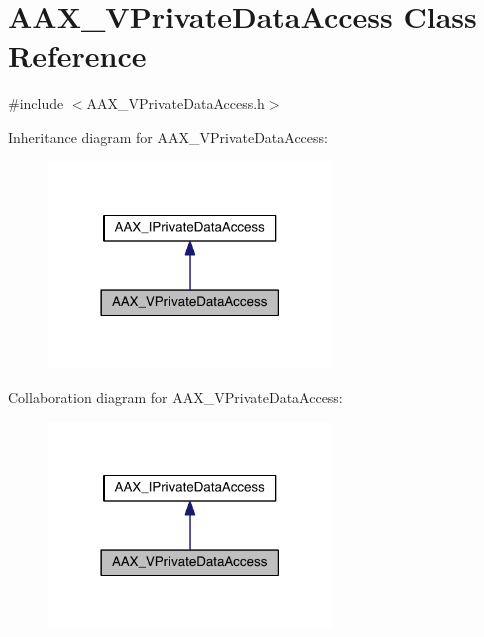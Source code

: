 \hypertarget{a00139}{}\section{A\+A\+X\+\_\+\+V\+Private\+Data\+Access Class Reference}
\label{a00139}


{\ttfamily \#include $<$A\+A\+X\+\_\+\+V\+Private\+Data\+Access.\+h$>$}



Inheritance diagram for A\+A\+X\+\_\+\+V\+Private\+Data\+Access\+:
\nopagebreak
\begin{figure}[H]
\begin{center}
\leavevmode
\includegraphics[width=213pt]{a00713}
\end{center}
\end{figure}


Collaboration diagram for A\+A\+X\+\_\+\+V\+Private\+Data\+Access\+:
\nopagebreak
\begin{figure}[H]
\begin{center}
\leavevmode
\includegraphics[width=213pt]{a00714}
\end{center}
\end{figure}


